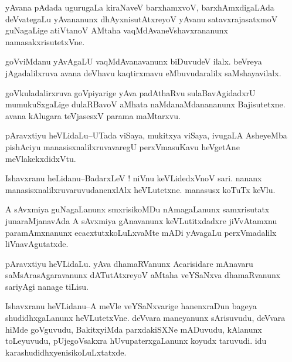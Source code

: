 \documentclass{article}
\begin{document}
\begin{mn}%
yAvana pAdada ugurugaLa kiraNaveV barxhamxvoV, barxhAmxdigaLAda deVvategaLu yAvananunx 
dhAyxnisutAtxreyoV yAvanu satavxrajasatxmoV guNagaLige atiVtanoV AMtaha 
vaqMdAvaneVshavxrananunx namasakxrisutetxVne.
\end{mn}

\begin{mn}%
goVviMdanu yAvAgaLU vaqMdAvanavanunx biDuvudeV ilalx. beVreya jAgadalilxruva avana deVhavu 
kaqtirxmavu eMbuvudaralilx saMshayavilalx.
\end{mn}

\begin{mn}%
goVkuladalirxruva goVpiyarige yAva padAthaRvu sulaBavAgidadxrU mumukuSxgaLige dulaRBavoV 
aMhata naMdanaMdanananunx Bajisutetxne. avana kAlugara teVjasesxV parama maMtarxvu.
\end{mn}

\begin{mn}%
pAravxtiyu heVLidaLu--UTada viSaya, mukitxya viSaya, ivugaLA AsheyeMba pishAciyu 
manasisxnalilxruvavaregU perxVmasuKavu heVgetAne meVlakekxdidxVtu.
\end{mn}

\begin{mn}%
Ishavxranu heLidanu--BadarxLeV ! niVnu keVLidedxVnoV sari. nananx 
manasisxnalilxruvaruvudanenxlAlx heVLutetxne. manasusx koTuTx keVlu.
\end{mn}

\begin{mn}%
A sAvxmiya guNagaLanunx smxrisikoMDu nAmagaLanunx samxrisutatx junaraMjanavAda A sAvxmiya 
gAnavanunx keVLutitxdadxre jiVvAtamxnu paramAmxnanunx ecacxtutxkoLuLxvaMte mADi yAvagaLu 
perxVmadalilx liVnavAgutatxde.
\end{mn}


\begin{mn}%
pAravxtiyu heVLidaLu. yAva dhamaRVanunx Acarisidare mAnavaru saMsArasAgaravanunx 
dATutAtxreyoV aMtaha veYSaNxva dhamaRvanunx sariyAgi nanage tiLisu.
\end{mn}

\begin{mn}%
Ishavxranu heVLidanu--A meVle veYSaNxvarige hanenxraDun bageya shudidhxgaLanunx 
heVLutetxVne. deVvara maneyanunx sArisuvudu, deVvara hiMde goVguvudu, BakitxyiMda 
parxdakiSXNe mADuvudu, kAlanunx toLeyuvudu, pUjegoVsakxra hUvupaterxgaLanunx koyudx 
taruvudi. idu karashudidhxyenisikoLuLxtatxde.
\end{mn}
\end{document}
